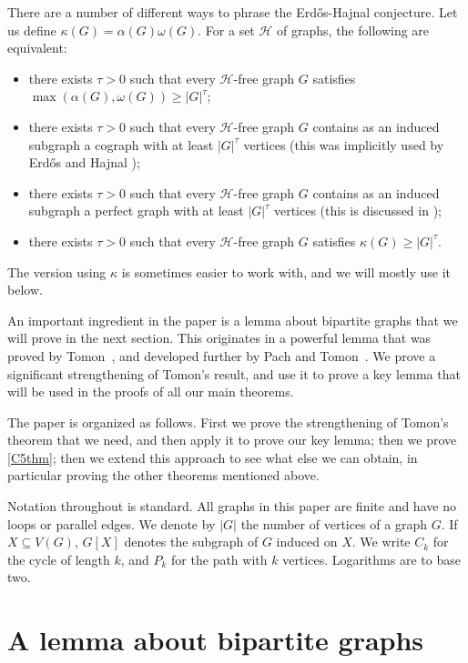 \documentclass[titlepage,11pt]{article}
\begin{document}
There are a number of different ways to phrase the Erd\H os-Hajnal conjecture.
Let us define $\kappa(G)=\alpha(G)\omega(G)$.
For a set $\mathcal{H}$ of graphs, the following are equivalent:
\begin{itemize}
\item there exists $\tau>0$ such that every $\mathcal{H}$-free graph $G$ satisfies $\max(\alpha(G),\omega(G))\ge |G|^\tau$;
\item there exists $\tau>0$ such that every $\mathcal{H}$-free graph $G$ contains as an induced subgraph a cograph with at least $|G|^\tau$ vertices (this was implicitly used by Erd\H os and Hajnal \cite{EH});
\item there exists $\tau>0$ such that every $\mathcal{H}$-free graph $G$ contains as an induced subgraph a perfect graph with at least $|G|^\tau$ vertices (this is discussed in \cite{Gy});
\item there exists $\tau>0$ such that every $\mathcal{H}$-free graph $G$ satisfies $\kappa(G)\ge |G|^\tau$.
\end{itemize}
The version using $\kappa$ is sometimes easier to work with, and we will mostly use it below.

An important ingredient in the paper is a lemma about bipartite graphs that we will prove in the next section.  This originates in
a powerful lemma that was proved by Tomon~\cite{tomon}, and developed further by Pach and Tomon~\cite{pach}.
We prove a significant strengthening of Tomon's result, and use it to prove a key lemma that will be used in the proofs of all our main theorems.


The paper is organized as follows. First we prove the strengthening of Tomon's theorem that we need, and then apply it to prove our key lemma; then
we prove \ref{C5thm}; then we extend this approach
to see what else we can obtain, in particular proving the other theorems mentioned above.


Notation throughout is standard. All graphs in this paper are finite and have no loops or parallel edges. We denote by $|G|$ the number of vertices of a graph $G$.
If $X\subseteq V(G)$, $G[X]$ denotes the subgraph of $G$ induced on $X$.
We write $C_k$ for the cycle of length $k$, and $P_k$ for the path with $k$ vertices.
Logarithms are to base two.

\section{A lemma about bipartite graphs}
\end{document}
